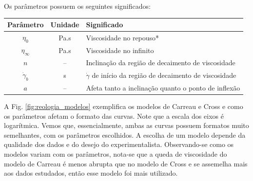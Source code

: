 \begin{apendicesenv}
Os parâmetros possuem os seguintes significados:

\begin{table}[H]
		{%
		\begin{tabular}{c c p{9cm}}
			\toprule
			   Parâmetro     & Unidade   & Significado                                                     \\ \midrule
			    $\eta_0$     & Pa.s      & Viscosidade no repouso*                                         \\
			$\eta_{\infty}$  & Pa.s      & Viscosidade no infinito                                         \\
			      $n$        & --        & Inclinação da região de decaimento de viscosidade               \\
			$\dot{\gamma}_b$ & s\menosUm & $\dot{\gamma}$ de início da região de decaimento de viscosidade \\ \midrule
			      $a$        & --        & Afeta tanto a inclinação quanto o ponto de inflexão             \\ \bottomrule
		\end{tabular}%
		}{}
\end{table}

A Fig. \ref{fig:reologia_modelos} exemplifica os modelos de Carreau e Cross e como os parâmetros afetam o formato das curvas. Note que a escala dos eixos é logarítmica. Vemos que, essencialmente, ambas as curvas possuem formatos muito semelhantes, com os parâmetros escolhidos. A escolha de um modelo depende da qualidade dos dados e do desejo do experimentalista. Observando-se como os modelos variam com os parâmetros, nota-se que a queda de viscosidade do modelo de Carreau é menos abrupta que no modelo de Cross e se assemelha mais aos dados estudados, então esse modelo foi mais utilizado.


\end{apendicesenv}
